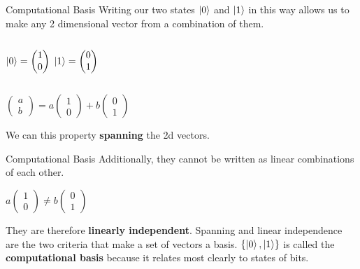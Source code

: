 \documentclass{beamer}
\begin{document}
\begin{frame}{Computational Basis}
    Writing our two states $\ket{0}$ and $\ket{1}$ in this way allows us to make any 2 dimensional vector from a combination of them.\vfill
    \centering
    \begin{columns}
        \centering
        \begin{math}
            \ket{0} = \begin{pmatrix}
                1 \\ 0
            \end{pmatrix}
        \end{math}
        \centering
        \begin{math}
            \ket{1} = \begin{pmatrix}
                0 \\ 1
            \end{pmatrix}
        \end{math}
    \end{columns}\vfill
    \begin{center}
        \begin{math}
            \begin{pmatrix}
                a \\ b
            \end{pmatrix}
            = a \begin{pmatrix}
                1 \\ 0
            \end{pmatrix}
            + b \begin{pmatrix}
                0 \\ 1
            \end{pmatrix}
        \end{math}\vfill
    \end{center}
    We can this property \textbf{spanning} the 2d vectors.
\end{frame}

\begin{frame}{Computational Basis}
    Additionally, they cannot be written as linear combinations of each other.
    \begin{center}
        \begin{math}
            a\begin{pmatrix}
                1 \\ 0
            \end{pmatrix}
            \ne b \begin{pmatrix}
                0 \\ 1
            \end{pmatrix}
        \end{math}
    \end{center}
    \pause
    They are therefore \textbf{linearly independent}.\vfill
    Spanning and linear independence are the two criteria that make a set of vectors a basis.\vfill
    \pause
    $\{\ket{0}, \ket{1}\}$ is called the \textbf{computational basis} because it relates most clearly to states of bits.\\
\end{frame}
    
\end{document}
